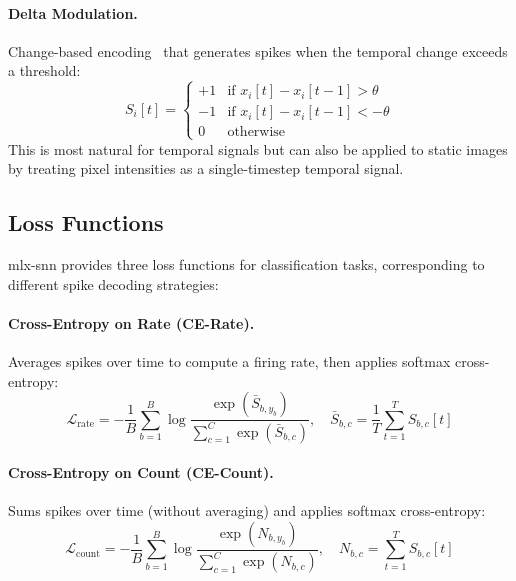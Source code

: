 \documentclass[11pt]{article}
\begin{document}
\paragraph{Delta Modulation.}
Change-based encoding~\citep{akolkar2015can} that generates spikes when the temporal change exceeds a threshold:
\begin{equation}
    S_i[t] = \begin{cases}
        +1 & \text{if } x_i[t] - x_i[t-1] > \theta \\
        -1 & \text{if } x_i[t] - x_i[t-1] < -\theta \\
        0 & \text{otherwise}
    \end{cases}
    \label{eq:delta}
\end{equation}
This is most natural for temporal signals but can also be applied to static images by treating pixel intensities as a single-timestep temporal signal.

\subsection{Loss Functions}
\label{sec:loss}

mlx-snn provides three loss functions for classification tasks, corresponding to different spike decoding strategies:

\paragraph{Cross-Entropy on Rate (CE-Rate).}
Averages spikes over time to compute a firing rate, then applies softmax cross-entropy:
\begin{equation}
    \mathcal{L}_{\text{rate}} = -\frac{1}{B}\sum_{b=1}^{B} \log \frac{\exp(\bar{S}_{b,y_b})}{\sum_{c=1}^{C} \exp(\bar{S}_{b,c})}, \quad \bar{S}_{b,c} = \frac{1}{T}\sum_{t=1}^{T} S_{b,c}[t]
    \label{eq:ce_rate}
\end{equation}

\paragraph{Cross-Entropy on Count (CE-Count).}
Sums spikes over time (without averaging) and applies softmax cross-entropy:
\begin{equation}
    \mathcal{L}_{\text{count}} = -\frac{1}{B}\sum_{b=1}^{B} \log \frac{\exp(N_{b,y_b})}{\sum_{c=1}^{C} \exp(N_{b,c})}, \quad N_{b,c} = \sum_{t=1}^{T} S_{b,c}[t]
    \label{eq:ce_count}
\end{equation}
\end{document}
